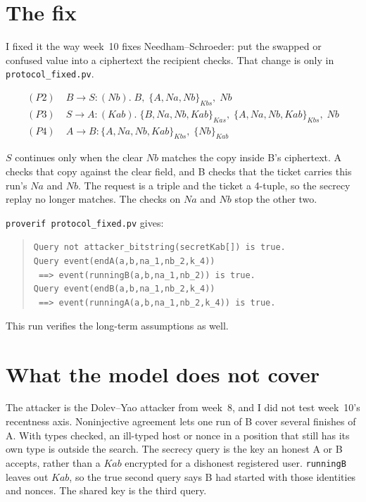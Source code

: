 \documentclass[11pt]{article}
\newcommand{\enc}[2]{\{#1\}_{#2}}
\begin{document}
\section{The fix}

I fixed it the way week~10 fixes Needham--Schroeder: put the swapped or confused value into a ciphertext the recipient checks. That change is only in \texttt{protocol\_fixed.pv}.

\begin{align*}
(P2)\;& B \rightarrow S : (Nb).\; B,\; \enc{A, Na, Nb}{Kbs},\; Nb \\
(P3)\;& S \rightarrow A : (Kab).\; \enc{B, Na, Nb, Kab}{Kas},\; \enc{A, Na, Nb, Kab}{Kbs},\; Nb \\
(P4)\;& A \rightarrow B : \enc{A, Na, Nb, Kab}{Kbs},\; \enc{Nb}{Kab}
\end{align*}

$S$ continues only when the clear $Nb$ matches the copy inside B's ciphertext. A checks that copy against the clear field, and B checks that the ticket carries this run's $Na$ and $Nb$. The request is a triple and the ticket a 4-tuple, so the secrecy replay no longer matches. The checks on $Na$ and $Nb$ stop the other two.

\texttt{proverif protocol\_fixed.pv} gives:

\begin{quote}\raggedright\small
\texttt{Query not attacker\_bitstring(secretKab[]) is true.}\\[0.3em]
\texttt{Query event(endA(a,b,na\_1,nb\_2,k\_4))}\\
\texttt{\ ==> event(runningB(a,b,na\_1,nb\_2)) is true.}\\[0.3em]
\texttt{Query event(endB(a,b,na\_1,nb\_2,k\_4))}\\
\texttt{\ ==> event(runningA(a,b,na\_1,nb\_2,k\_4)) is true.}
\end{quote}

This run verifies the long-term assumptions as well.

\section{What the model does not cover}

The attacker is the Dolev--Yao attacker from week~8, and I did not test week~10's recentness axis. Noninjective agreement lets one run of B cover several finishes of A. With types checked, an ill-typed host or nonce in a position that still has its own type is outside the search. The secrecy query is the key an honest A or B accepts, rather than a $Kab$ encrypted for a dishonest registered user. \texttt{runningB} leaves out $Kab$, so the true second query says B had started with those identities and nonces. The shared key is the third query.
\end{document}
